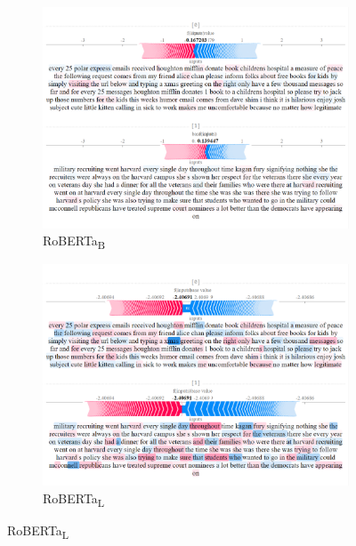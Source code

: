 \begin{figure}[!h]\ContinuedFloat
    \captionsetup[subfigure]{justification=Centering}

    \begin{subfigure}[t]{0.4\textwidth}
        \includegraphics[width=\textwidth]{figs/one_TF/roberta-b.png}
        \caption{{RoBERTa}\textsubscript{B}}
    \end{subfigure}
    \hspace{\fill} %
    \begin{subfigure}[t]{0.4\textwidth}
        \includegraphics[width=\linewidth]{figs/one_TF/roberta-l.png}
        \caption{{RoBERTa}\textsubscript{L}}
    \end{subfigure}



\end{figure}

